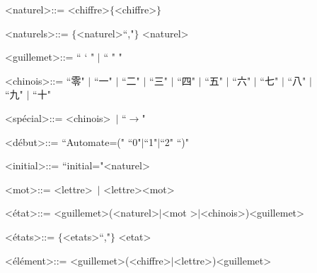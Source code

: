 \documentclass[a4paper,14pt,UTF8]{article}
\begin{document}
\begin{itemize}
\begin{description}
				\item[] \textless naturel\textgreater ::= \textless chiffre\textgreater  $\lbrace$\textless chiffre\textgreater $\rbrace$\par
				
				\item[] \textless naturels\textgreater ::= $\lbrace$\textless naturel\textgreater ``,"$\rbrace$ \textless naturel\textgreater \par
				
				\item[] \textless guillemet\textgreater ::= `` ` " $|$ `` " " \par
				
				\item[] \textless chinois\textgreater ::= ``零" $|$ ``一" $|$ ``二" $|$ ``三" $|$ ``四" $|$ ``五" $|$ ``六" $|$ ``七" $|$ ``八" $|$ ``九" $|$ ``十"
				
				\item[] \textless spécial\textgreater ::= \textless chinois\textgreater \ $|$ ``$ \to$" \par
				
				\item[] \textless début\textgreater ::= ``Automate=(" ``0"$|$``1"$|$``2" ``)" \par
				
				\item[] \textless initial\textgreater ::= ``initial="\textless naturel\textgreater \par
				
				\item[] \textless mot\textgreater ::= \textless lettre\textgreater  \ $|$ \textless lettre\textgreater \textless mot\textgreater \par
				
				\item[] \textless état\textgreater ::= \textless guillemet\textgreater (\textless naturel\textgreater$|$\textless mot \textgreater$|$\textless chinois\textgreater)\textless guillemet\textgreater \par
				
				\item[] \textless états\textgreater ::= $\lbrace$\textless etats\textgreater``,"$\rbrace$ \textless etat\textgreater
				
				\item[] \textless élément\textgreater ::= \textless guillemet\textgreater (\textless chiffre\textgreater $|$\textless lettre\textgreater)\textless guillemet\textgreater \par
				

\end{description}
\end{itemize}
\end{document}
